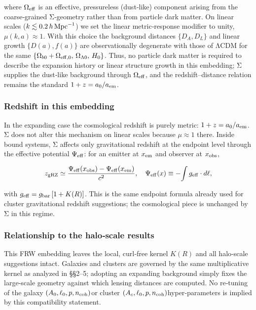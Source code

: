 \documentclass[11pt,a4paper]{article}
\begin{document}
where $\Omega_{\rm eff}$ is an effective, pressureless (dust‑like) component arising from the coarse‑grained Σ‑geometry rather than from particle dark matter. On linear scales ($\allowbreak k \lesssim 0.2\,h\,{\rm Mpc}^{-1}$\allowbreak ) we set the linear metric‑response modifier to unity, $\mu(k,a) \approx 1$. With this choice the background distances $\{D_A, D_L\}$ and linear growth $\{D(a), f(a)\}$ are observationally degenerate with those of ΛCDM for the same $\allowbreak \{\Omega_{b0} + \Omega_{\rm eff,0},\, \Omega_{\Lambda 0},\, H_0\}$\allowbreak . Thus, no particle dark matter is required to describe the expansion history or linear structure growth in this embedding; Σ supplies the dust‑like background through $\Omega_{\rm eff}$, and the redshift–distance relation remains the standard $1+z = a_0/a_{\rm em}$.


\subsubsection{Redshift in this embedding}


In the expanding case the cosmological redshift is purely metric: $1+z = a_0/a_{\rm em}$. Σ does not alter this mechanism on linear scales because $\mu \approx 1$ there. Inside bound systems, Σ affects only gravitational redshift at the endpoint level through the effective potential $\Psi_{\rm eff}$: for an emitter at $x_{\rm em}$ and observer at $x_{\rm obs}$,


\begin{equation}
z_{\rm gRZ} \simeq \frac{\Psi_{\rm eff}(x_{\rm obs}) - \Psi_{\rm eff}(x_{\rm em})}{c^2}, \quad \Psi_{\rm eff}(x) \equiv -\!\int g_{\rm eff}\cdot d\ell,
\end{equation}


with $\allowbreak g_{\rm eff} = g_{\rm bar}\,[1 + K(R)]$\allowbreak . This is the same endpoint formula already used for cluster gravitational redshift suggestions; the cosmological piece is unchanged by Σ in this regime.


\subsubsection{Relationship to the halo‑scale results}


This FRW embedding leaves the local, curl‑free kernel $K(R)$ and all halo‑scale suggestions intact. Galaxies and clusters are governed by the same multiplicative kernel as analyzed in §§2–5; adopting an expanding background simply fixes the large‑scale geometry against which lensing distances are computed. No re‑tuning of the galaxy $\allowbreak (A_0, \ell_0, p, n_{\rm coh})$\allowbreak  or cluster $\allowbreak (A_c, \ell_0, p, n_{\rm coh})$\allowbreak  hyper‑parameters is implied by this compatibility statement.
\end{document}
